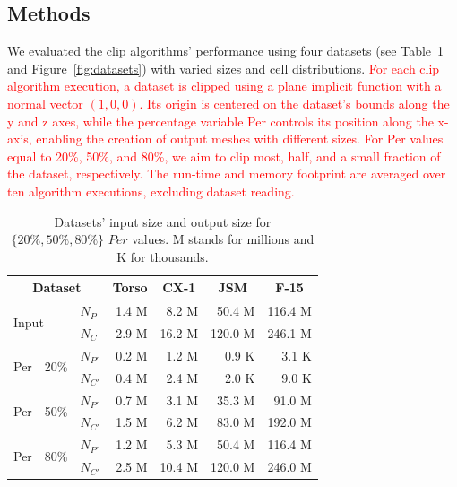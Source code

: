 \documentclass{egpubl}
\newcommand*{\fix}[1]{\textcolor{red}{#1}}
\begin{document}
\subsection{Methods}

We evaluated the clip algorithms' performance using four datasets (see Table~\ref{tab:datasets} and Figure~\ref{fig:datasets}) with varied sizes and cell distributions. \fix{For each clip algorithm execution, a dataset is clipped using a plane implicit function with a normal vector $(1, 0, 0)$. Its origin is centered on the dataset's bounds along the y and z axes, while the percentage variable Per controls its position along the x-axis, enabling the creation of output meshes with different sizes. For Per values equal to 20\%, 50\%, and 80\%, we aim to clip most, half, and a small fraction of the dataset, respectively. The run-time and memory footprint are averaged over ten algorithm executions, excluding dataset reading.}

\begin{table}[H]
\centering
\caption{Datasets' input size and output size for $\{20\%, 50\%, 80\%\}$ $Per$ values. M stands for millions and K for thousands.}
\label{tab:datasets}
\begin{tabular}{lllrrrr}
\toprule
\multicolumn{3}{c}{Dataset}                            & \multicolumn{1}{c}{Torso} & \multicolumn{1}{c}{CX-1} & \multicolumn{1}{c}{JSM} & \multicolumn{1}{c}{F-15} \\
\midrule
\multicolumn{2}{l}{\multirow{2}{*}{Input}}  &   $N_P$    &  1.4 M  &   8.2 M  &   50.4 M  &  116.4 M  \\
\multicolumn{2}{l}{}                        &   $N_C$    &  2.9 M  &  16.2 M  &  120.0 M  &  246.1 M  \\
\midrule
\multirow{2}{*}{Per} & \multirow{2}{*}{20\%} &  $N_{P'}$  &  0.2 M  &   1.2 M  &    0.9 K  &    3.1 K  \\
                     &                      &  $N_{C'}$  &  0.4 M  &   2.4 M  &    2.0 K  &    9.0 K  \\
\midrule
\multirow{2}{*}{Per} & \multirow{2}{*}{50\%} &  $N_{P'}$  &  0.7 M  &   3.1 M  &   35.3 M  &   91.0 M  \\
                     &                      &  $N_{C'}$  &  1.5 M  &   6.2 M  &   83.0 M  &  192.0 M  \\
\midrule
\multirow{2}{*}{Per} & \multirow{2}{*}{80\%} &  $N_{P'}$  &  1.2 M  &   5.3 M  &   50.4 M  &  116.4 M  \\
                     &                      &  $N_{C'}$  &  2.5 M  &  10.4 M  &  120.0 M  &  246.0 M  \\
\bottomrule
\end{tabular}
\end{table}
\end{document}
